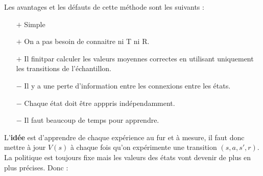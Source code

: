 Les avantages et les défauts de cette méthode sont les suivants :
\begin{itemize}[label=\textbullet]
    \item[$+$] Simple
    \item[$+$] On a pas besoin de connaitre ni T ni R.
    \item[$+$] Il finitpar calculer les valeurs moyennes correctes en utilisant uniquement les transitions de l'échantillon.
    \item[$-$] Il y a une perte d'information entre les connexions entre les états.
    \item[$-$] Chaque état doit être apppris indépendamment.
    \item[$-$] Il faut beaucoup de temps pour apprendre. 
\end{itemize}

\label{ssubsub:td_learning}
L'\textbf{idée} est d'apprendre de chaque expérience au fur et à mesure, il faut donc mettre à jour $V(s)$ à chaque fois qu'on
expérimente une transition $(s,a,s',r)$. La politique est toujours fixe mais les valeurs des états vont devenir de plus en plus 
précises. Donc :
 
